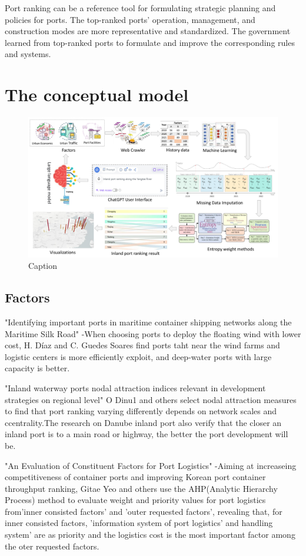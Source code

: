 \documentclass[preprint]{elsarticle}
\begin{document}
Port ranking can be a reference tool for formulating strategic planning and policies for ports. The top-ranked ports' operation, management, and construction modes are more representative and standardized. The government learned from top-ranked ports to formulate and improve the corresponding rules and systems.

\section{The conceptual model}
\begin{figure}[H]
    \centering
    \includegraphics[width=1.0\textwidth]{autoportranking.pdf}
    \caption{Caption}
    \label{fig:enter-label}
\end{figure}
\subsection{Factors}
"Identifying important ports in maritime container shipping networks along the Maritime Silk Road" -When choosing ports to deploy the floating wind with lower cost, H. Díaz  and C. Guedes Soares find ports taht near the wind farms and logistic centers is more efficiently exploit, and deep-water ports with large capacity is better.

"Inland waterway ports nodal attraction indices relevant in development strategies on regional level"
O Dinu1 and others select nodal attraction measures to  find that port ranking varying differently depends on network scales and ccentrality.The research on Danube inland   port also verify that the closer an inland port is to a main road or highway, the better the port development will be.

"An Evaluation of Constituent Factors for Port Logistics" -Aiming at increaseing competitiveness of container ports and improving Korean port container throughput ranking, Gitae Yeo and others use the AHP(Analytic Hierarchy Process) method to evaluate weight and priority values for port logistics from'inner consisted factors' and 'outer requested factors', revealing that, for inner consisted factors, 'information system of port logistics' and handling system' are as priority and the logistics cost is the most important factor among the oter requested factors.
\end{document}
